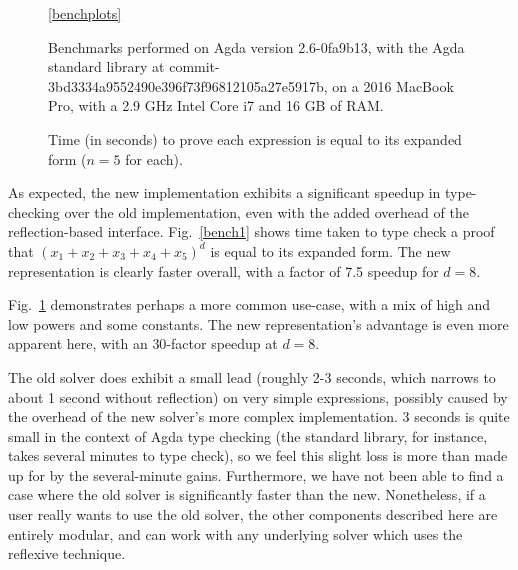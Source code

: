 \documentclass[acmsmall,review,anonymous]{acmart}\settopmatter{printfolios=true,printccs=false,printacmref=false}
\theoremstyle{remark}
\begin{document}
\begin{figure}[b]
\begin{subfigure}[t]{0.3\textwidth}
    \label{bench3}
  \end{subfigure}
  \begin{minipage}{0.13\textwidth}
    \vspace{-20pt}
    \ref{benchplots}
  \end{minipage}%
  \begin{minipage}{0.87\textwidth}
    \vspace{-20pt}
    \begin{flushleft}
      \caption{Time (in seconds) to prove each expression is equal to its expanded
        form ($n = 5$ for each).}
      \label{benchmarks}
      \smallskip
      \footnotesize
      Benchmarks performed on Agda version 2.6-0fa9b13, with the Agda standard
      library at commit-3bd3334a9552490e396f73f96812105a27e5917b, on a 2016
      MacBook Pro, with a 2.9 GHz Intel Core i7 and 16 GB of RAM.
    \end{flushleft}
  \end{minipage} 
\end{figure}

As expected, the new implementation exhibits a significant speedup in
type-checking over the old implementation, even with the added overhead of the
reflection-based interface. Fig.~\ref{bench1} shows time taken to type check a
proof that \((x_1 + x_2 + x_3 + x_4 + x_5)^d\) is equal to its expanded form.
The new representation is clearly faster overall, with a factor of 7.5
speedup for \(d = 8\).

Fig.~\ref{bench3} demonstrates perhaps a more common use-case, with a mix of
high and low powers and some constants. The new representation's advantage is
even more apparent here, with an \(30\)-factor speedup at \(d = 8\).

The old solver does exhibit a small lead (roughly 2-3 seconds, which narrows
to about 1 second without reflection) on very simple expressions, possibly
caused by the overhead of the new solver's more complex implementation. 3
seconds is quite small in the context of Agda type checking (the standard
library, for instance, takes several minutes to type check), so we feel this
slight loss is more than made up for by the several-minute gains. Furthermore,
we have not been able to find a case where the old solver is significantly
faster than the new. Nonetheless, if a user really wants to use the old
solver, the other components described here are entirely modular, and can work
with any underlying solver which uses the reflexive technique.
\end{document}
